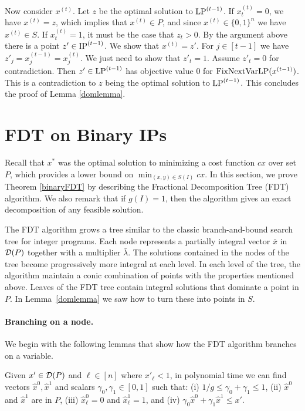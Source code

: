 Now consider $x^{(t)}$. Let $z$ be the optimal solution to $\operatorname{LP}^{(t-1)}$. If $x^{(t)}_t = 0$, we have $x^{(t)} = z$, which implies that $x^{(t)}\in P$, and since $x^{(t)}\in \{0,1\}^n$ we have $x^{(t)}\in S$. If $x^{(t)}_t =1$, it must be the case that $z_t > 0$. By the argument above there is a point $z'\in \operatorname{IP}^{(t-1)}$. We show that $x^{(t)} = z'$. For $j\in [t-1]$ we have $z'_j= x_j^{(t-1)}=x_j^{(t)}$. We just need to show that $z'_t = 1$. Assume $z'_t	 = 0$ for contradiction. Then $z'\in \operatorname{LP}^{(t-1)}$ has objective value $0$ for $\operatorname{{{FixNextVarLP}}}(x^{(t-1)})$. This is a contradiction to $z$ being the optimal solution to $\operatorname{LP}^{(t-1)}$. This concludes the proof of Lemma \ref{domlemma}. 



\section{FDT on Binary IPs}
\label{sec:binaryfdt}
Recall that $x^*$ was the optimal solution to minimizing a cost function $cx$ over set $P$, which provides a lower bound on $\min_{(x,y)\in S(I)} cx$.  In this section, we prove Theorem \ref{binaryFDT} by describing the Fractional Decomposition Tree (FDT) algorithm. We also remark that if $g(I)=1$, then the algorithm gives an exact decomposition of any feasible solution. 


The FDT algorithm grows a tree similar to the classic branch-and-bound search tree for integer programs. Each node represents a partially integral vector $\bar{x}$ in $\operatorname{\mathcal{D}}(P)$ together with a multiplier $\bar{\lambda}$. The solutions contained in the nodes of the tree become progressively more integral at each level. In each level of the tree, the algorithm maintain a conic combination of points with the properties mentioned above. Leaves of the FDT tree contain integral solutions
that dominate a point in $P$. In Lemma~\ref{domlemma} we saw how to turn these into points in $S$. 

\paragraph{Branching on a node.}
We begin with the following lemmas that show how the FDT algorithm branches on a variable.
\begin{lemma}\label{LPClemma}
	Given $x'\in \operatorname{\mathcal{D}}(P)$ and $\ell\in [n]$ where $x'_{\ell}<1$, in polynomial time we can find vectors $\hat{x}^0,\hat{x}^1$ and scalars $\gamma_0,\gamma_1 \in [0,1]$ such that: (i) $1/g \leq \gamma_0 + \gamma_1  \leq 1$, (ii) $\hat{x}^0$ and $\hat{x}^1$ are in  $ P$, (iii) $\hat{x}^0_\ell=0$ and $\hat{x}^1_\ell=1$, and (iv) $\gamma_0 \hat{x}^0 + \gamma_1\hat{x}^1 \leq x'$.
\end{lemma}


